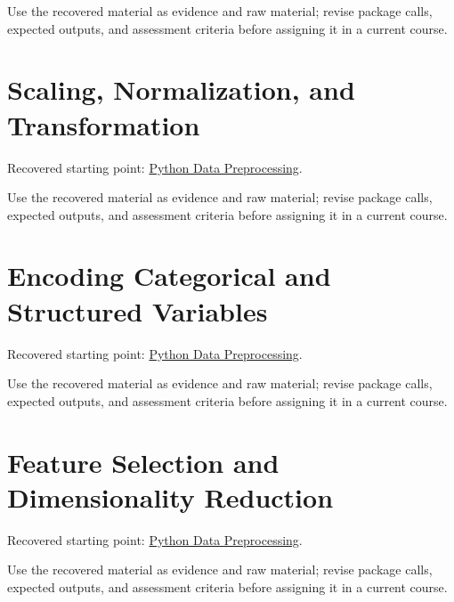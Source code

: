 \documentclass[
  letterpaper,
]{scrbook}
\begin{document}
Use the recovered material as evidence and raw material; revise package
calls, expected outputs, and assessment criteria before assigning it in
a current course.

\section*{Scaling, Normalization, and
Transformation}\label{sec-pr-06-scaling-normalization-and-transformation}


Recovered starting point: \hyperref[sec-lab-data-preprocessing]{Python
Data Preprocessing}.

Use the recovered material as evidence and raw material; revise package
calls, expected outputs, and assessment criteria before assigning it in
a current course.

\section*{Encoding Categorical and Structured
Variables}\label{sec-pr-06-encoding-categorical-and-structured-variables}


Recovered starting point: \hyperref[sec-lab-data-preprocessing]{Python
Data Preprocessing}.

Use the recovered material as evidence and raw material; revise package
calls, expected outputs, and assessment criteria before assigning it in
a current course.

\section*{Feature Selection and Dimensionality
Reduction}\label{sec-pr-06-feature-selection-and-dimensionality-reduction}


Recovered starting point: \hyperref[sec-lab-data-preprocessing]{Python
Data Preprocessing}.

Use the recovered material as evidence and raw material; revise package
calls, expected outputs, and assessment criteria before assigning it in
a current course.
\end{document}
